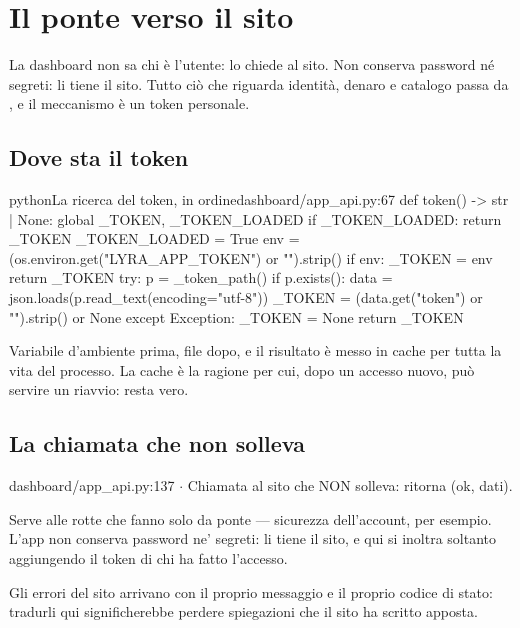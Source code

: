 \section{Il ponte verso il sito}\label{sez:ponte}

La dashboard non sa chi è l'utente: lo chiede al sito. Non conserva password
né segreti: li tiene il sito. Tutto ciò che riguarda identità, denaro e
catalogo passa da , e il meccanismo è un token
personale.

\subsection{Dove sta il token}

\begin{codiceInterno}{python}{La ricerca del token, in ordine}{dashboard/app\_api.py:67}
def token() -> str | None:
    global _TOKEN, _TOKEN_LOADED
    if _TOKEN_LOADED:
        return _TOKEN
    _TOKEN_LOADED = True
    env = (os.environ.get("LYRA_APP_TOKEN") or "").strip()
    if env:
        _TOKEN = env
        return _TOKEN
    try:
        p = _token_path()
        if p.exists():
            data = json.loads(p.read_text(encoding="utf-8"))
            _TOKEN = (data.get("token") or "").strip() or None
    except Exception:
        _TOKEN = None
    return _TOKEN
\end{codiceInterno}

\noindent
Variabile d'ambiente prima, file dopo, e il risultato è messo in cache per
tutta la vita del processo. La cache è la ragione per cui, dopo un accesso
nuovo, può servire un riavvio:  resta vero.

\subsection{La chiamata che non solleva}

\begin{commento}{dashboard/app\_api.py:137 $\cdot$ }
Chiamata al sito che NON solleva: ritorna (ok, dati).

Serve alle rotte che fanno solo da ponte — sicurezza dell'account, per
esempio. L'app non conserva password ne' segreti: li tiene il sito, e qui
si inoltra soltanto aggiungendo il token di chi ha fatto l'accesso.

Gli errori del sito arrivano con il proprio messaggio e il proprio codice
di stato: tradurli qui significherebbe perdere spiegazioni che il sito ha
scritto apposta.
\end{commento}

